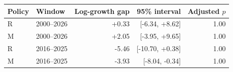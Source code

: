 \begin{tabular}{@{}llrrr@{}}\toprule
Policy & Window & Log-growth gap & 95\% interval & Adjusted $p$\\\midrule
R & 2000--2026 & +0.33 & [-6.34, +8.62] & 1.00\\
M & 2000--2026 & +2.05 & [-3.95, +9.65] & 1.00\\
R & 2016--2025 & -5.46 & [-10.70, +0.38] & 1.00\\
M & 2016--2025 & -3.93 & [-8.04, -0.34] & 1.00\\
\bottomrule
\end{tabular}
